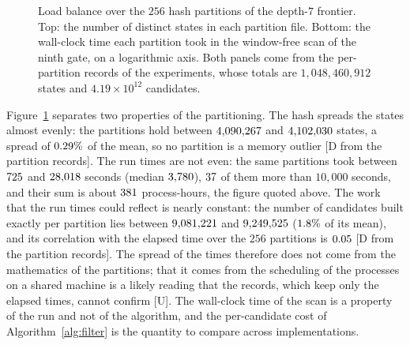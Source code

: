 \documentclass[11pt]{article}
\theoremstyle{definition}
\theoremstyle{remark}
\begin{document}
\begin{figure}[t]
\centering
{}
\caption{Load balance over the $256$ hash partitions of the depth-$7$ frontier. Top: the number of
distinct states in each partition file. Bottom: the wall-clock time each partition took in the
window-free scan of the ninth gate, on a logarithmic axis. Both panels come from the per-partition
records of the experiments, whose totals are $1{,}048{,}460{,}912$ states and $4.19 \times 10^{12}$ candidates.}
\label{fig:partitions}
\end{figure}

Figure~\ref{fig:partitions} separates two properties of the partitioning. The hash spreads the
states almost evenly: the partitions hold between $4{,}090{,}267$ and $4{,}102{,}030$ states,
a spread of $0.29\%$ of the mean, so no partition is a memory outlier [D from the
partition records]. The run times are not even: the same partitions took between $725$ and
$28{,}018$ seconds (median $3{,}780$), $37$ of them more than $10{,}000$
seconds, and their sum is about $381$ process-hours, the figure quoted above. The work
that the run times could reflect is nearly constant: the number of candidates built exactly per
partition lies between $9{,}081{,}221$ and $9{,}249{,}525$ ($1.8\%$ of its mean), and
its correlation with the elapsed time over the $256$ partitions is $0.05$ [D from the
partition records]. The spread of the times therefore does not come from the mathematics of the
partitions; that it comes from the scheduling of the processes on a shared machine is a likely
reading that the records, which keep only the elapsed times, cannot confirm [U]. The wall-clock
time of the scan is a property of the run and not of the algorithm, and the per-candidate cost
of Algorithm~\ref{alg:filter} is the quantity to compare across implementations.
\end{document}
